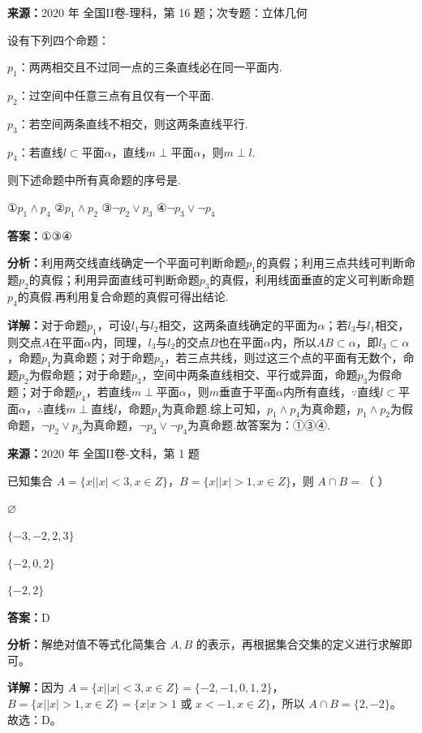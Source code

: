 \begin{question}[points=5]
\textbf{来源：}2020 年 全国II卷-理科，第 16 题；次专题：立体几何\par
设有下列四个命题：

$p_1$：两两相交且不过同一点的三条直线必在同一平面内.

$p_2$：过空间中任意三点有且仅有一个平面.

$p_3$：若空间两条直线不相交，则这两条直线平行.

$p_4$：若直线$l\subset$平面$\alpha$，直线$m\perp$平面$\alpha$，则$m\perp l$.

则下述命题中所有真命题的序号是.

①$p_1\land p_4$ ②$p_1\land p_2$ ③$\lnot p_2\lor p_3$ ④$\lnot p_3\lor\lnot p_4$
\fillin[{$①③④$}]
\begin{solution}
\textbf{答案：}$①③④$

\textbf{分析：}利用两交线直线确定一个平面可判断命题$p_1$的真假；利用三点共线可判断命题$p_2$的真假；利用异面直线可判断命题$p_3$的真假，利用线面垂直的定义可判断命题$p_4$的真假.再利用复合命题的真假可得出结论.

\textbf{详解：}对于命题$p_1$，可设$l_1$与$l_2$相交，这两条直线确定的平面为$\alpha$；若$l_3$与$l_1$相交，则交点$A$在平面$\alpha$内，同理，$l_3$与$l_2$的交点$B$也在平面$\alpha$内，所以$AB\subset\alpha$，即$l_3\subset\alpha$，命题$p_1$为真命题；对于命题$p_2$，若三点共线，则过这三个点的平面有无数个，命题$p_2$为假命题；对于命题$p_3$，空间中两条直线相交、平行或异面，命题$p_3$为假命题；对于命题$p_4$，若直线$m\perp$平面$\alpha$，则$m$垂直于平面$\alpha$内所有直线，$\because$直线$l\subset$平面$\alpha$，$\therefore$直线$m\perp$直线$l$，命题$p_4$为真命题.综上可知，$p_1\land p_4$为真命题，$p_1\land p_2$为假命题，$\lnot p_2\lor p_3$为真命题，$\lnot p_3\lor\lnot p_4$为真命题.故答案为：①③④.
\end{solution}
\end{question}

\begin{question}[points=5]
\textbf{来源：}2020 年 全国II卷-文科，第 1 题\par
已知集合 $A=\{x||x|<3, x \in Z\}$，$B=\{x||x|>1, x \in Z\}$，则 $A \cap B=$（ ）
\begin{choices}
  \item $\varnothing$
  \item $\{-3, -2, 2, 3\}$
  \item $\{-2, 0, 2\}$
  \item $\{-2, 2\}$
\end{choices}
\begin{solution}
\textbf{答案：}D

\textbf{分析：}解绝对值不等式化简集合 $A, B$ 的表示，再根据集合交集的定义进行求解即可。

\textbf{详解：}因为 $A=\{x||x|<3, x \in Z\}=\{-2, -1, 0, 1, 2\}$，$B=\{x||x|>1, x \in Z\}=\{x|x>1 \text{ 或 } x<-1, x \in Z\}$，所以 $A \cap B=\{2, -2\}$。
故选：D。
\end{solution}
\end{question}

